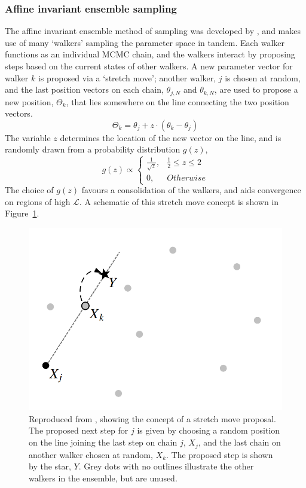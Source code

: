 \subsubsection{Affine invariant ensemble sampling}
\label{sect:modelling:Affine invariant ensemble sampling}
The affine invariant ensemble method of sampling was developed by \citet{goodman2010}, and makes use of many `walkers' sampling the parameter space in tandem.
Each walker functions as an individual MCMC chain, and the walkers interact by proposing steps based on the current states of other walkers.
A new parameter vector for walker $k$ is proposed via a `stretch move'; another walker, $j$ is chosen at random, and the last position vectors on each chain, $\theta_{j,N}$ and $\theta_{k,N}$, are used to propose a new position, $\Theta_k$, that lies somewhere on the line connecting the two position vectors.
\begin{equation}
    \Theta_k = \theta_j + z \cdot (\theta_k - \theta_j)
\end{equation}
The variable $z$ determines the location of the new vector on the line, and is randomly drawn from a probability distribution $g(z)$,
\begin{equation}
    g(z) \propto
    \begin{cases}
        \frac{1}{\sqrt{z}}, & \frac{1}{2} \le z \le 2 \\
        0, & Otherwise
    \end{cases}
\end{equation}
The choice of $g(z)$ favours a consolidation of the walkers, and aids convergence on regions of high $\mathcal{L}$. A schematic of this stretch move concept is shown in Figure~\ref{fig:modelling:stretch move}.
\begin{figure}
    \centering
    \includegraphics[width=.7\textwidth]{figures/modelling/stretch_move.png}
    \caption{Reproduced from \citet{goodman2010}, showing the concept of a stretch move proposal. The proposed next step for $j$ is given by choosing a random position on the line joining the last step on chain $j$, $X_j$, and the last chain on another walker chosen at random, $X_k$. The proposed step is shown by the star, $Y$. Grey dots with no outlines illustrate the other walkers in the ensemble, but are unused.}
\label{fig:modelling:stretch move}
\end{figure}

